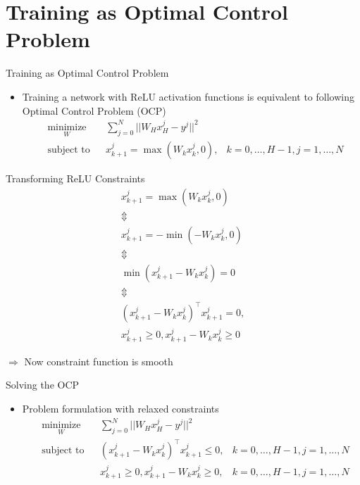 \documentclass[11pt,t]{beamer}
\begin{document}
\section{Training as Optimal Control Problem}

\begin{frame}{Training as Optimal Control Problem}
   \begin{itemize}
   \item Training a network with ReLU activation functions is equivalent to following Optimal Control Problem (OCP)
      \begin{equation*}
      \begin{aligned}
      & \underset{W}{\text{minimize}}
      & & \sum\limits_{j=0}^{N}||W_Hx_H^j - y^j||^2 \\
      & \text{subject to}
      & & x_{k+1}^j = \max(W_kx_k^j,0), &k = 0,\ldots,H-1,j = 1,\ldots,N
      \end{aligned}
      \end{equation*}
   \end{itemize}
\end{frame}

\begin{frame}{Transforming ReLU Constraints}
   \begin{gather*}
   x_{k+1}^j = \max(W_kx_k^j,0) \\
   \Updownarrow \\
   x_{k+1}^j = -\min(-W_kx_k^j,0) \\
   \Updownarrow \\
   \min(x_{k+1}^j-W_kx_k^j) = 0 \\
   \Updownarrow \\
   (x_{k+1}^j-W_kx_k^j)^\top x_{k+1}^j = 0,\\
   x_{k+1}^j\geq 0,x_{k+1}^j-W_kx_k^j\geq 0
   \end{gather*}
   
   $\Rightarrow$ Now constraint function is smooth
\end{frame}

\begin{frame}{Solving the OCP}
   \begin{itemize}
   \item Problem formulation with relaxed constraints
      \begin{equation*}
      \begin{aligned}
      & \underset{W}{\text{minimize}}
      & & \sum\limits_{j=0}^{N}||W_Hx_H^j - y^j||^2 \\
      & \text{subject to}
      & & (x_{k+1}^j-W_kx_k^j)^\top x_{k+1}^j {\boldsymbol\leq} 0, &k = 0,\ldots,H-1,j = 1,\ldots,N \\
      & & & x_{k+1}^j\geq 0,x_{k+1}^j-W_kx_k^j\geq 0, &k = 0,\ldots,H-1,j = 1,\ldots,N
      \end{aligned}
      \end{equation*}
   \end{itemize}
\end{frame}
\end{document}
